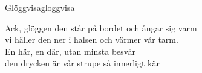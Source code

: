 \begin{song}{Glöggvisa}{gloggvisa}
\begin{vers}
Ack, glöggen den står på bordet och ångar sig varm\\
vi häller den ner i halsen och värmer vår tarm.\\
En här, en där, utan minsta besvär\\
den drycken är vår strupe så innerligt kär\\
\end{vers}
\end{song}
